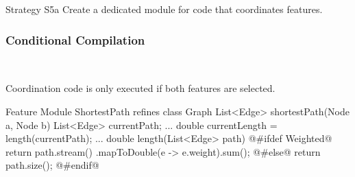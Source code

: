 \begin{frame}{\myframetitle}
	\begin{fancycolumns}[widths={30},animation=none]
		\begin{definition}{Strategy S5a}
			Create a dedicated module for code that coordinates features.
		\end{definition}
		\nextcolumn
	\end{fancycolumns}
\end{frame}

\subsubsection*{Conditional Compilation}

\begin{frame}[fragile]{\myframetitle{}}
	\begin{fancycolumns}[animation=none]
		\centering
		
		~
		\begin{note}{}
			Coordination code is only executed if both features are selected.
		\end{note}
		\nextcolumn
		\begin{codetight}{Feature Module ShortestPath}
			refines class Graph {
				List<Edge> shortestPath(Node a, Node b){
					List<Edge> currentPath;
					... 
					double currentLength = length(currentPath);
					... 
				}
				double length(List<Edge> path) {
					@#ifdef Weighted@
					return path.stream()
							.mapToDouble(e -> e.weight).sum();
					@#else@
					return path.size();
					@#endif@
				}
			}
		\end{codetight}
	\end{fancycolumns}
\end{frame}


%

